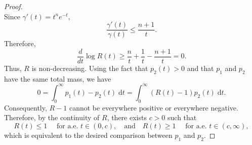 \documentclass[11pt]{amsart}
\theoremstyle{plain}
\theoremstyle{definition}
\theoremstyle{remark}
\begin{document}
\begin{proof}
\[        \]
        Since $ \gamma ' (t) = t^ne^{-t}$,
        $$
            \frac{\gamma'(t)}{\gamma(t)} \leq \frac{n+1}{t}.
        $$
        Therefore,
        \[
            \frac{d}{d t} \log R(t) \geq \frac{n}{t} +\frac{1}{t} - \frac{n+1}{t} = 0.
        \]
        Thus, $R$ is non-decreasing.
        Using the fact that $p_2(t)>0$ and that $p_1$ and $p_2$ have the same total mass, we have
        $$
        0=\int_0^{\infty}p_1(t)-p_2(t) \;\mathrm  d t=\int_0^{\infty}(R(t)-1) p_2(t) \;\mathrm  d t.
        $$
        Consequently, $R-1$ cannot be everywhere positive or everywhere negative. Therefore, by the continuity of $R$, there exists $c>0$ such that
        $$
        R(t) \leq 1 \quad \text { for a.e. } t \in(0, c),
        \quad \text{and} \quad R(t) \geq 1 \quad \text { for a.e. } t \in(c, \infty) ,
        $$
        which is equivalent to the desired comparison between $p_1$ and $p_2$.
\end{proof}
\plunruzzero*
\end{document}
